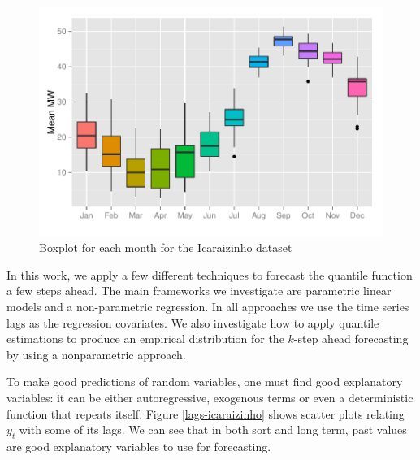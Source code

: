 \begin{figure}
	\centering
	\includegraphics[width=0.8\linewidth]{./Figuras/Icaraizinho/icaraizinho-boxplot}
	\caption{Boxplot for each month for the Icaraizinho dataset}
	\label{fig:icaraizinho-boxplot}
\end{figure}

In this work, we apply a few different techniques to forecast the quantile function a few steps ahead. The main frameworks we investigate are parametric linear models and a non-parametric regression. In all approaches we use the time series lags as the regression covariates. We also investigate how to apply quantile estimations to produce an empirical distribution for the $k$-step ahead forecasting by using a nonparametric approach.


To make good predictions of random variables, one must find good explanatory variables: it can be either autoregressive, exogenous terms or even a deterministic function that repeats itself. 
Figure \ref{lags-icaraizinho} shows scatter plots relating $y_t$ with some of its lags. We can see that in both sort and long term, past values are good explanatory variables to use for forecasting.

